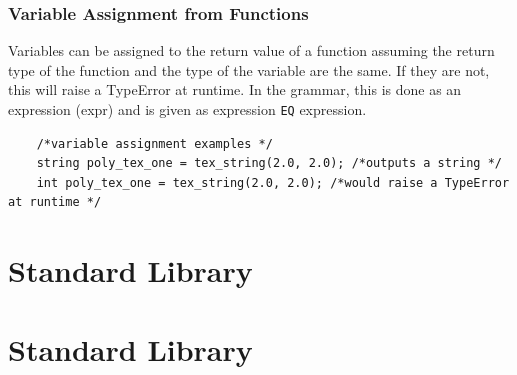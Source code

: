 \documentclass{article}
\begin{document}
\subsubsection{Variable Assignment from Functions}

Variables can be assigned to the return value of a function assuming the return type of the function and the type of the variable are the same. If they are not, this will raise a TypeError at runtime. In the grammar, this is done as an expression (expr) and is given as expression \lstinline{EQ} expression.

\begin{lstlisting}
    /*variable assignment examples */
    string poly_tex_one = tex_string(2.0, 2.0); /*outputs a string */
    int poly_tex_one = tex_string(2.0, 2.0); /*would raise a TypeError at runtime */
\end{lstlisting}

\section{Standard Library}
\section{Standard Library}
\end{document}
